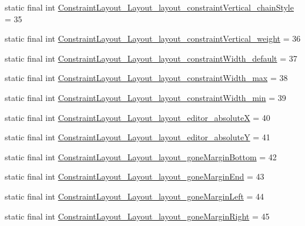 \begin{DoxyCompactItemize}
static final int \mbox{\hyperlink{classandroid_1_1support_1_1constraint_1_1R_1_1styleable_a8ee062d3be4cc02b2f86e0d35af139cf}{Constraint\+Layout\+\_\+\+Layout\+\_\+layout\+\_\+constraint\+Vertical\+\_\+chain\+Style}} = 35
\item 
static final int \mbox{\hyperlink{classandroid_1_1support_1_1constraint_1_1R_1_1styleable_a958cb3d0c7db603c63821645b6196be1}{Constraint\+Layout\+\_\+\+Layout\+\_\+layout\+\_\+constraint\+Vertical\+\_\+weight}} = 36
\item 
static final int \mbox{\hyperlink{classandroid_1_1support_1_1constraint_1_1R_1_1styleable_a84af0da0135a755a6faf896efcf9a647}{Constraint\+Layout\+\_\+\+Layout\+\_\+layout\+\_\+constraint\+Width\+\_\+default}} = 37
\item 
static final int \mbox{\hyperlink{classandroid_1_1support_1_1constraint_1_1R_1_1styleable_a58a9ef15e1211d238355af16409572e2}{Constraint\+Layout\+\_\+\+Layout\+\_\+layout\+\_\+constraint\+Width\+\_\+max}} = 38
\item 
static final int \mbox{\hyperlink{classandroid_1_1support_1_1constraint_1_1R_1_1styleable_ac9e6f0cc337028313b9f0705f1189d3f}{Constraint\+Layout\+\_\+\+Layout\+\_\+layout\+\_\+constraint\+Width\+\_\+min}} = 39
\item 
static final int \mbox{\hyperlink{classandroid_1_1support_1_1constraint_1_1R_1_1styleable_a3a630dd8a36ce3807a41986aa0fe5a09}{Constraint\+Layout\+\_\+\+Layout\+\_\+layout\+\_\+editor\+\_\+absoluteX}} = 40
\item 
static final int \mbox{\hyperlink{classandroid_1_1support_1_1constraint_1_1R_1_1styleable_a60a0b71e2940dfd8197c2071e9847161}{Constraint\+Layout\+\_\+\+Layout\+\_\+layout\+\_\+editor\+\_\+absoluteY}} = 41
\item 
static final int \mbox{\hyperlink{classandroid_1_1support_1_1constraint_1_1R_1_1styleable_a09316ac54a83e6a6085f3234e0d5dd48}{Constraint\+Layout\+\_\+\+Layout\+\_\+layout\+\_\+gone\+Margin\+Bottom}} = 42
\item 
static final int \mbox{\hyperlink{classandroid_1_1support_1_1constraint_1_1R_1_1styleable_ae54b563d01fb0986e67bd2d088e1389c}{Constraint\+Layout\+\_\+\+Layout\+\_\+layout\+\_\+gone\+Margin\+End}} = 43
\item 
static final int \mbox{\hyperlink{classandroid_1_1support_1_1constraint_1_1R_1_1styleable_aa68b4322dc31311470fbb33eb2657cb6}{Constraint\+Layout\+\_\+\+Layout\+\_\+layout\+\_\+gone\+Margin\+Left}} = 44
\item 
static final int \mbox{\hyperlink{classandroid_1_1support_1_1constraint_1_1R_1_1styleable_a4f89a5e49b0c6aed4f6b95e5d3008cff}{Constraint\+Layout\+\_\+\+Layout\+\_\+layout\+\_\+gone\+Margin\+Right}} = 45

\end{DoxyCompactItemize}
